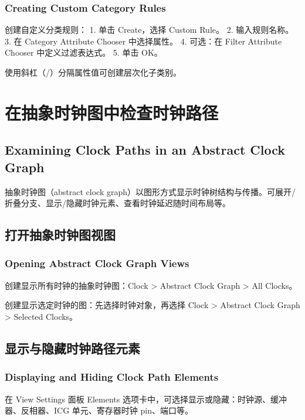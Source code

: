 \subsubsection*{Creating Custom Category Rules}

创建自定义分类规则：
1. 单击 Create，选择 Custom Rule。
2. 输入规则名称。
3. 在 Category Attribute Chooser 中选择属性。
4. 可选：在 Filter Attribute Chooser 中定义过滤表达式。
5. 单击 OK。

使用斜杠（/）分隔属性值可创建层次化子类别。

\section{在抽象时钟图中检查时钟路径}
\subsection*{Examining Clock Paths in an Abstract Clock Graph}

抽象时钟图（abstract clock graph）以图形方式显示时钟树结构与传播。可展开/折叠分支、显示/隐藏时钟元素、查看时钟延迟随时间布局等。


\subsection{打开抽象时钟图视图}
\subsubsection*{Opening Abstract Clock Graph Views}

创建显示所有时钟的抽象时钟图：Clock > Abstract Clock Graph > All Clocks。

创建显示选定时钟的图：先选择时钟对象，再选择 Clock > Abstract Clock Graph > Selected Clocks。

\subsection{显示与隐藏时钟路径元素}
\subsubsection*{Displaying and Hiding Clock Path Elements}

在 View Settings 面板 Elements 选项卡中，可选择显示或隐藏：时钟源、缓冲器、反相器、ICG 单元、寄存器时钟 pin、端口等。


